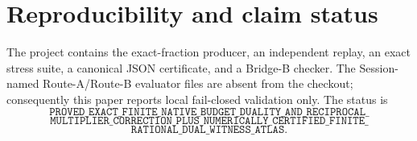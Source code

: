 \documentclass[11pt]{article}
\begin{document}
\section*{Reproducibility and claim status}

The project contains the exact-fraction producer, an independent replay, an
exact stress suite, a canonical JSON certificate, and a Bridge-B checker.
The Session-named Route-A/Route-B evaluator files are absent from the
checkout; consequently this paper reports local fail-closed validation only.
The status is
\[
\texttt{PROVED\_EXACT\_FINITE\_NATIVE\_BUDGET\_DUALITY\_AND\_RECIPROCAL\_}
\]
\[
\texttt{MULTIPLIER\_CORRECTION\_PLUS\_NUMERICALLY\_CERTIFIED\_FINITE\_}
\]
\[
\texttt{RATIONAL\_DUAL\_WITNESS\_ATLAS}.
\]



\end{document}
